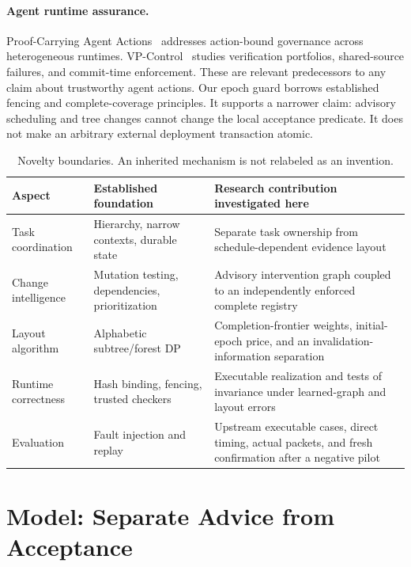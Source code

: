 \documentclass[11pt]{article}
\theoremstyle{definition}\newtheorem{definition}[theorem]{Definition}
\theoremstyle{remark}\newtheorem{remark}[theorem]{Remark}
\begin{document}
\paragraph{Agent runtime assurance.}
Proof-Carrying Agent Actions~\cite{pcaa} addresses action-bound governance across heterogeneous runtimes. VP-Control~\cite{vpcontrol} studies verification portfolios, shared-source failures, and commit-time enforcement. These are relevant predecessors to any claim about trustworthy agent actions. Our epoch guard borrows established fencing and complete-coverage principles. It supports a narrower claim: advisory scheduling and tree changes cannot change the local acceptance predicate. It does not make an arbitrary external deployment transaction atomic.

\begin{table}[t]
\centering\small
\caption{Novelty boundaries. An inherited mechanism is not relabeled as an invention.}
\begin{tabularx}{\linewidth}{@{}p{.23\linewidth}XX@{}}
\toprule
Aspect & Established foundation & Research contribution investigated here\\
\midrule
Task coordination & Hierarchy, narrow contexts, durable state & Separate task ownership from schedule-dependent evidence layout\\
Change intelligence & Mutation testing, dependencies, prioritization & Advisory intervention graph coupled to an independently enforced complete registry\\
Layout algorithm & Alphabetic subtree/forest DP & Completion-frontier weights, initial-epoch price, and an invalidation-information separation\\
Runtime correctness & Hash binding, fencing, trusted checkers & Executable realization and tests of invariance under learned-graph and layout errors\\
Evaluation & Fault injection and replay & Upstream executable cases, direct timing, actual packets, and fresh confirmation after a negative pilot\\
\bottomrule
\end{tabularx}
\end{table}

\section{Model: Separate Advice from Acceptance}
\end{document}
